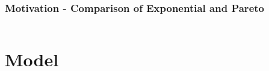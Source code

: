 \documentclass[red]{beamer}
\begin{document}
\begin{frame}
	\frametitle{Motivation - Comparison of Exponential and Pareto}
	
  \begin{columns}[c]
  	\column{2in}  %
  	\column{2in}
  \end{columns}
	
\end{frame}

\section{Model}
\end{document}
